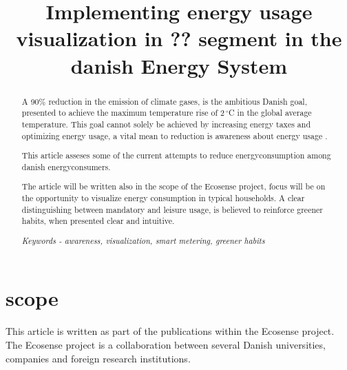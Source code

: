 \documentclass[journal]{IEEEtran}
\begin{document}
%
\title{Implementing energy usage visualization in ?? segment in the danish Energy System}


\author{
}









\maketitle


\begin{abstract}
A 90\% reduction in the emission of climate gases, is the ambitious Danish goal, presented to achieve the maximum temperature rise of 2$\,^{\circ}$C  in the global average temperature. This goal cannot solely be achieved by increasing energy taxes and optimizing energy usage, a vital mean to reduction is awareness about energy usage	. 

This article asseses some of the current attempts to reduce energyconsumption among danish energyconsumers.

The article will be written also in the scope of the Ecosense project, focus will be on the opportunity to visualize energy consumption in typical households. A clear distinguishing between mandatory and leisure usage, is believed to reinforce greener habits, when presented clear and intuitive.

\textit{Keywords - awareness, visualization, smart metering, greener habits}
\end{abstract}

\section{scope}
This article is written as part of the publications within the Ecosense project. The Ecosense project is a collaboration between several Danish universities, companies and foreign research institutions. 
\end{document}

